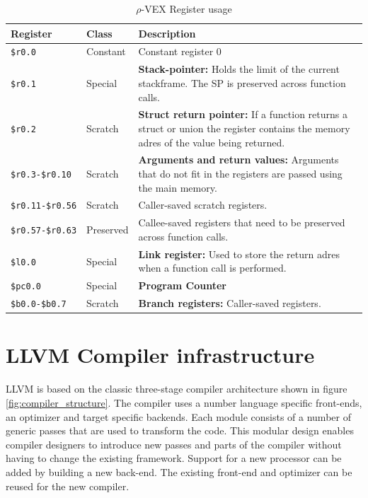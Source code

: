 \begin{table}
  \centering
    \begin{tabular}{|l|l|p{10cm}|}
    \hline
    \textbf{Register} & \textbf{Class} & \textbf{Description}   \\ \hline
    \texttt{\$r0.0}         & Constant  & Constant register 0  \\ \hline
    \texttt{\$r0.1}         & Special   & \textbf{Stack-pointer:} Holds the limit of the current stackframe. 
                                          The SP is preserved across function calls.  \\ \hline
    \texttt{\$r0.2}         & Scratch   & \textbf{Struct return pointer:} If a function returns a struct or union the register
                                          contains the memory adres of the value being returned.  \\ \hline
    \texttt{\$r0.3-\$r0.10} & Scratch   & \textbf{Arguments and return values:} Arguments that do not fit in the registers are
                                          passed using the main memory.  \\ \hline
    \texttt{\$r0.11-\$r0.56}& Scratch   & Caller-saved scratch registers.  \\ \hline
    \texttt{\$r0.57-\$r0.63}& Preserved & Callee-saved registers that need to be preserved across function calls.  \\ \hline
    \texttt{\$l0.0}         & Special   & \textbf{Link register:} Used to store the return adres when a function call is 
                                          performed.  \\ \hline
    \texttt{\$pc0.0}        & Special   & \textbf{Program Counter}  \\ \hline
    \texttt{\$b0.0-\$b0.7}  & Scratch   & \textbf{Branch registers:} Caller-saved registers.  \\ \hline
    \end{tabular}
  \caption{$\rho$-VEX Register usage \cite{Joseph-A.-Fisher:2012rm}}
  \label{tbl:rvex_reg}
\end{table}

\section{LLVM Compiler infrastructure}
LLVM is based on the classic three-stage compiler architecture shown in figure \ref{fig:compiler_structure}. The compiler uses a number language specific front-ends, an optimizer and target specific backends. Each module consists of a number of generic passes that are used to transform the code. This modular design enables compiler designers to introduce new passes and parts of the compiler without having to change the existing framework. Support for a new processor can be added by building a new back-end. The existing front-end and optimizer can be reused for the new compiler.

